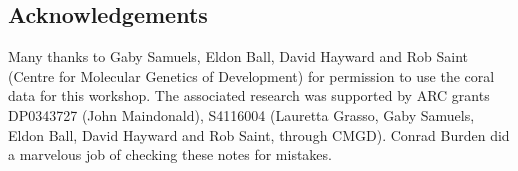 \documentclass[a4paper,9pt]{article}
\begin{document}
\subsection*{Acknowledgements}
Many thanks to Gaby Samuels, Eldon Ball, David Hayward and Rob Saint
(Centre for Molecular Genetics of Development) for permission to use
the coral data for this workshop.  The associated research was
supported by ARC grants DP0343727 (John Maindonald), S4116004
(Lauretta Grasso, Gaby Samuels, Eldon Ball, David Hayward and Rob
Saint, through CMGD).  Conrad Burden did a marvelous job of checking
these notes for mistakes.
\end{document}

